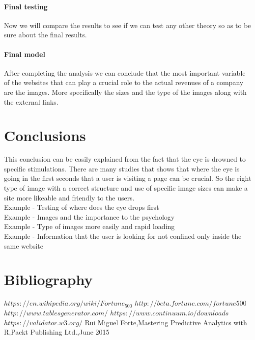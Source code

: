 \documentclass{article}
\begin{document}
\paragraph{Final testing}
Now we will compare the results to see if we can test any other theory so as to be sure about the final results.
\paragraph{Final model}
After completing the analysis we can conclude that the most important variable of the websites that can play a crucial role to the actual revenues of a company are the images. More specifically the sizes and the type of the images along with the external links.
\pagebreak  
\section{Conclusions}
This conclusion can be easily explained from the fact that the eye is drowned to specific stimulations. There are many studies that shows that where the eye is going in the first seconds that a user is visiting a page can be crucial. So the right type of image with a correct structure and use of specific image sizes can make a site more likeable and friendly to the users.\\
Example - Testing of where does the eye drops first\\
Example - Images and the importance to the psychology\\
Example - Type of images more easily and rapid loading\\
Example - Information that the user is looking for not confined only inside the same website\\
\pagebreak  
\section{Bibliography}
\begin{thebibliography}{widest-label}

$https://en.wikipedia.org/wiki/Fortune_500$
$http://beta.fortune.com/fortune500$
$http://www.tablesgenerator.com/$
$https://www.continuum.io/downloads$
$https://validator.w3.org/$
Rui Miguel Forte,Mastering Predictive Analytics with R,Packt Publishing Ltd.,June 2015


\end{thebibliography}

\newpage
\appendix
\end{document}
